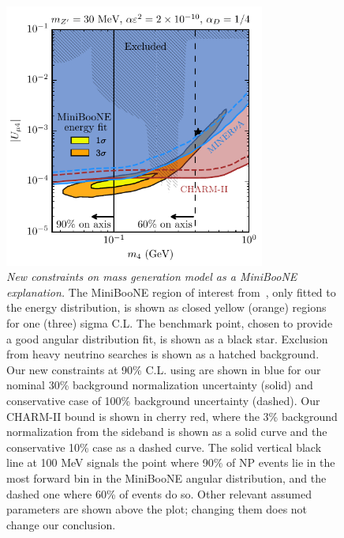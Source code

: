 %
\begin{figure}[t]
    \centering
    \includegraphics[width=3.38in]{bounds.pdf}
    \caption{{\textit{New constraints on mass generation model as a MiniBooNE explanation.}} The MiniBooNE region of interest from~\cite{Bertuzzo:2018itn}, only fitted to the energy distribution, is shown as closed yellow (orange) regions for one (three) sigma C.L. The benchmark point, chosen to provide a good angular distribution fit, is shown as a black star. Exclusion from heavy neutrino searches is shown as a hatched background. Our new constraints at 90\% C.L. using \minerva are shown in blue for our nominal 30\% background normalization uncertainty (solid) and conservative case of 100\% background uncertainty (dashed). Our CHARM-II bound is shown in cherry red, where the 3\% background normalization from the sideband is shown as a solid curve and the conservative 10\% case as a dashed curve. The solid vertical black line at 100 MeV signals the point where 90\% of NP events lie in the most forward bin in the MiniBooNE angular distribution, and the dashed one where 60\% of events do so. Other relevant assumed parameters are shown above the plot; changing them does not change our conclusion.}
    \label{fig:final_plot}
\end{figure}
%

